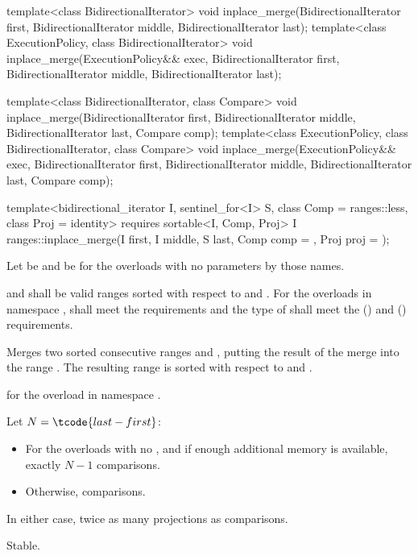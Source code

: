 %
\begin{itemdecl}
template<class BidirectionalIterator>
  void inplace_merge(BidirectionalIterator first,
                     BidirectionalIterator middle,
                     BidirectionalIterator last);
template<class ExecutionPolicy, class BidirectionalIterator>
  void inplace_merge(ExecutionPolicy&& exec,
                     BidirectionalIterator first,
                     BidirectionalIterator middle,
                     BidirectionalIterator last);

template<class BidirectionalIterator, class Compare>
  void inplace_merge(BidirectionalIterator first,
                     BidirectionalIterator middle,
                     BidirectionalIterator last, Compare comp);
template<class ExecutionPolicy, class BidirectionalIterator, class Compare>
  void inplace_merge(ExecutionPolicy&& exec,
                     BidirectionalIterator first,
                     BidirectionalIterator middle,
                     BidirectionalIterator last, Compare comp);

template<bidirectional_iterator I, sentinel_for<I> S, class Comp = ranges::less,
         class Proj = identity>
  requires sortable<I, Comp, Proj>
  I ranges::inplace_merge(I first, I middle, S last, Comp comp = {}, Proj proj = {});
\end{itemdecl}

\begin{itemdescr}
\pnum
Let  be 
and  be 
for the overloads with no parameters by those names.

\pnum
\requires
{} and  shall be valid ranges
sorted with respect to  and .
For the overloads in namespace ,
 shall meet
the  requirements and
the type of  shall meet
the  () and
 () requirements.

\pnum
\effects
Merges two sorted consecutive ranges
 and ,
putting the result of the merge into the range .
The resulting range is sorted with respect to  and .

\pnum
\returns
{} for the overload in namespace .

\pnum
\complexity
Let $N = \tcode{last - first}$:
\begin{itemize}
\item
  For the overloads with no , and
  if enough additional memory is available, exactly $N - 1$ comparisons.
\item
  Otherwise,  comparisons.
\end{itemize}
In either case, twice as many projections as comparisons.

\pnum
\remarks
Stable.
\end{itemdescr}

